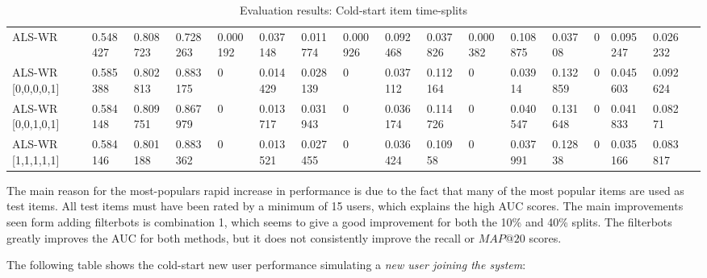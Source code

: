\begin{table}[H]
{\begin{tabular}{*{17}{l}}
\rowcolor{Gray}
ALS-WR 			   & 0.548427&	0.808723&	0.728263&	0.000192&	0.037148&	0.011774&	0.000926&	0.092468&	0.037826&	0.000382&	0.108875&	0.03708	&	0	&	0.095247	&	0.026232	&	\\
ALS-WR [0,0,0,0,1] & 0.585388&	0.802813&	0.883175&	0		&	0.014429&	0.028139&	0		&	0.037112&	0.112164	&	0	&	0.03914	&	0.132859	&	0	&	0.045603	&	0.092624	& \\
ALS-WR [0,0,1,0,1] & 0.584148&	0.809751&	0.867979&	0		&	0.013717&	0.031943&	0		&	0.036174&	0.114726&	0	&	0.040547&	0.131648&	0	&	0.041833&	0.08271	& \\
ALS-WR [1,1,1,1,1] & 0.584146&	0.801188&	0.883362&	0		&	0.013521&	0.027455&	0		&	0.036424&	0.10958&	0&	0.037991&	0.12838	&	0	&	0.035166	&	0.083817	& \\

\bottomrule
\end{tabular}
}
\caption{Evaluation results: Cold-start item time-splits}
\end{table}

The main reason for the most-populars rapid increase in performance is due to the fact that many of the most popular items are used as test items.
All test items must have been rated by a minimum of 15 users, which explains the high AUC scores. The main improvements seen form adding filterbots is combination 1, which seems to give a good improvement for both the 10\% and 40\% splits. The filterbots greatly improves the AUC for both methods,
but it does not consistently improve the recall or $MAP@20$ scores.

The following table shows the cold-start new user performance simulating a \emph{new user joining the system}:

